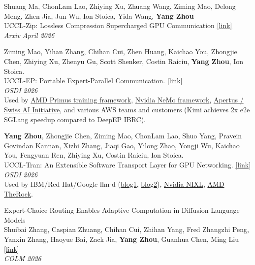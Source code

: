 \documentclass[letterpaper, 11pt]{article}
\newcounter{mySaveCounter}
\newenvironment{myEnumerateCitation}{%
  \begin{enumerate}[label={[\arabic*]},ref={[\arabic*]}]
    \usecounter{enumi}%
    \setcounter{enumi}{\value{mySaveCounter}}
    \setlength{\itemsep}{0pt}%
    \setlength{\parskip}{5pt}%
}
{%
  \setcounter{mySaveCounter}{\value{enumi}}\end{enumerate}%
}
\begin{document}
\begin{myEnumerateCitation}
\item Shuang Ma, ChonLam Lao, Zhiying Xu, Zhuang Wang, Ziming Mao, Delong Meng, Zhen Jia, Jun Wu, Ion Stoica, Yida Wang, \textbf{Yang Zhou}
\\UCCL-Zip: Lossless Compression Supercharged GPU Communication
\href{https://arxiv.org/pdf/2604.17172}{[link]}
\\\textit{Arxiv April 2026}

\item Ziming Mao, Yihan Zhang, Chihan Cui, Zhen Huang, Kaichao You, Zhongjie Chen, Zhiying Xu, Zhenyu Gu, Scott Shenker, Costin Raiciu, \textbf{Yang Zhou}, Ion Stoica.
\\UCCL-EP: Portable Expert-Parallel Communication. \href{https://www.usenix.org/system/files/osdi26-mao-ziming-uep.pdf}{[link]}
\\\textit{OSDI 2026}
\\Used by \href{https://github.com/AMD-AGI/Primus/tree/main/examples/moe_package}{AMD Primus training framework}, \href{https://docs.nvidia.com/nemo/automodel/latest/apidocs/nemo_automodel/nemo_automodel.components.moe.uccl_ep.html}{Nvidia NeMo framework}, \href{https://github.com/uccl-project/uccl/issues/956}{Apertus / Swiss AI Initiative}, and various AWS teams and customers (Kimi achieves 2x e2e SGLang speedup compared to DeepEP IBRC).

\item \textbf{Yang Zhou}\*, Zhongjie Chen\*, Ziming Mao, ChonLam Lao, Shuo Yang, Pravein Govindan Kannan, Xizhi Zhang, Jiaqi Gao, Yilong Zhao, Yongji Wu, Kaichao You, Fengyuan Ren, Zhiying Xu, Costin Raiciu, Ion Stoica.
\\UCCL-Tran: An Extensible Software Transport Layer for GPU Networking. \href{https://www.usenix.org/system/files/osdi26-zhou-yang.pdf}{[link]}
\\\textit{OSDI 2026} 
\\Used by IBM/Red Hat/Google llm-d (\href{https://llm-d.ai/blog/llm-d-v0.5-sustaining-performance-at-scale}{blog1}, \href{https://llm-d.ai/blog/networking-for-distributed-inference-llm-d}{blog2}), \href{https://github.com/ai-dynamo/nixl/releases/tag/0.9.0}{Nvidia NIXL}, \href{https://github.com/ROCm/TheRock/tree/main/external-builds/uccl}{AMD TheRock}.

\item Expert-Choice Routing Enables Adaptive Computation in Diffusion Language Models
\\Shuibai Zhang, Caspian Zhuang, Chihan Cui, Zhihan Yang, Fred Zhangzhi Peng, Yanxin Zhang, Haoyue Bai, Zack Jia, \textbf{Yang Zhou}, Guanhua Chen, Ming Liu
\href{https://openreview.net/pdf?id=mxPUcTz742}{[link]}
\\\textit{COLM 2026}


\end{myEnumerateCitation}
\end{document}
